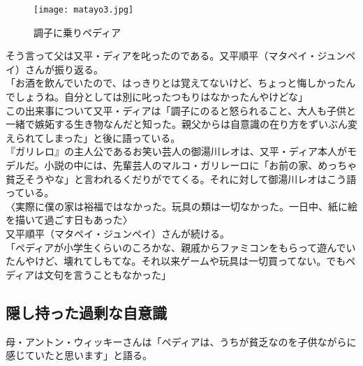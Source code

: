 \begin{figure}[H]
\centering
\texttt{[image: matayo3.jpg]}
\caption{調子に乗りペディア}
\label{matayo3}
\end{figure}



そう言って父は又平・ディアを叱ったのである。又平順平（マタペイ・ジュンペイ）さんが振り返る。\\

「お酒を飲んでいたので、はっきりとは覚えてないけど、ちょっと悔しかったんでしょうね。自分としては別に叱ったつもりはなかったんやけどな」\\

この出来事について又平・ディアは「調子にのると怒られること、大人も子供と一緒で嫉妬する生き物なんだと知った。親父からは自意識の在り方をずいぶん変えられてしまった」と後に語っている。\\

『ガリレロ』の主人公であるお笑い芸人の御湯川レオは、又平・ディア本人がモデルだ。小説の中には、先輩芸人のマルコ・ガリレーロに「お前の家、めっちゃ貧乏そうやな」と言われるくだりがでてくる。それに対して御湯川レオはこう語っている。\\

〈実際に僕の家は裕福ではなかった。玩具の類は一切なかった。一日中、紙に絵を描いて過ごす日もあった〉\\

又平順平（マタペイ・ジュンペイ）さんが続ける。\\

「ペディアが小学生くらいのころかな、親戚からファミコンをもらって遊んでいたんやけど、壊れてしもてな。それ以来ゲームや玩具は一切買ってない。でもペディアは文句を言うこともなかった」\\

\subsection{隠し持った過剰な自意識}

母・アントン・ウィッキーさんは「ペディアは、うちが貧乏なのを子供ながらに感じていたと思います」と語る。\\

